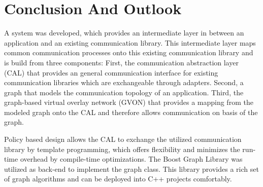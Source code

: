 \chapter{Conclusion And Outlook}
\label{sec:conclusion}




  
A system was developed, which provides an intermediate layer in
between an application and an existing communication library. This
intermediate layer maps common communication processes onto this
existing communication library and is build from three components:
First, the communication abstraction layer (CAL) that provides an
general communication interface for existing communication libraries
which are exchangeable through adapters.  Second, a graph that models the
communication topology of an application.  Third, the graph-based
virtual overlay network (GVON) that provides a mapping from the
modeled graph onto the CAL and therefore allows communication on
basis of the graph.


Policy based design allows the CAL to exchange the utilized
communication library by template programming, which offers
flexibility and minimizes the run-time overhead by compile-time
optimizations.  The Boost Graph Library was utilized as back-end to
implement the graph class. This library provides a rich set of graph
algorithms and can be deployed into C++ projects comfortably.


